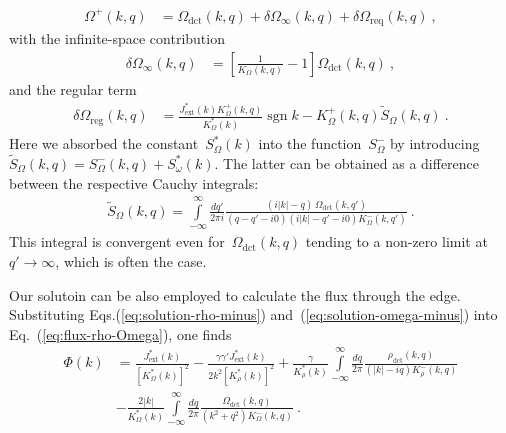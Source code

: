 \documentclass[preprint,aps,eqsecnum, prb]{revtex4-1}
\newcommand{\fplus}[1]{{#1}^{+}}
\newcommand{\fminus}[1]{{#1}^{-}}
\newcommand{\sgn}{\mathop{\mathrm{sgn}}\nolimits}
\newcommand{\dct}[1]{{#1}_\mathrm{dct}}
\begin{document}
\begin{align}
  \label{eq:solution-omega-plus}
  \fplus{\Omega}(k, q) &= \dct{\Omega}(k, q)
                           + \delta\Omega_{\infty}(k, q)
                           + \delta\Omega_\mathrm{req}(k, q)\ ,
\end{align}
with the infinite-space contribution
\begin{align}
  \delta\Omega_\mathrm{\infty}(k, q) &=
        \left[\frac{1}{K_\Omega(k, q)} - 1 \right] \dct{\Omega}(k, q)\ ,
\end{align}
and the regular term
\begin{align}
  \delta\Omega_\mathrm{reg}(k, q) &=
  \frac{J_\mathrm{ext}^\ast(k) \fplus{K}_\Omega(k, q)}{K_\Omega^\ast(k)}
                                    \sgn{k}
  - \fplus{K}_\Omega(k, q) {\tilde S}_\Omega(k, q)
  \ .
\end{align}
Here we absorbed the constant~$S_\Omega^\ast(k)$
into the function~$\fminus{S}_\Omega$ by introducing
${\tilde S}_\Omega(k, q) = \fminus{S}_\Omega(k, q) + S_\omega^\ast(k)$.
The latter can be obtained as a difference between  the
respective Cauchy integrals:
\begin{align}
  \label{eq:solution-psi}
  {\tilde{S}}_\Omega(k, q) = \int\limits_{-\infty}^{\infty}
  \frac{dq'}{2\pi i} \frac{(i|k| - q) \,
  \dct{\Omega}(k, q')}{(q - q' - i0)(i|k| - q' - i0) \fminus{K}_\Omega(k, q')}
  \ .
\end{align}
This integral is convergent even for~$\dct{\Omega}(k, q)$
tending to a non-zero limit at~$q'\to \infty$, which is often the case.

Our solutoin
can be also  employed to calculate the flux through the edge. Substituting
Eqs.(\ref{eq:solution-rho-minus}) and~(\ref{eq:solution-omega-minus})
into Eq.~(\ref{eq:flux-rho-Omega}),
one finds
\begin{align}
  \label{eq:phi-general}
  \Phi(k) &= \frac{J_\mathrm{ext}^\ast(k)}{\left[K_\Omega^\ast(k)\right]^2}
  - \frac{\gamma \gamma' J_\mathrm{ext}^\ast(k)}{2k^2 \left[K_\rho^\ast(k)\right]^2}
  + \frac{\gamma}{K_\rho^\ast(k)} \int\limits_{-\infty}^{\infty}
    \frac{dq}{2\pi}
  \frac{\dct{\rho}(k, q)}{(|k| - i q) \fminus{K}_\rho(k, q)}
  \nonumber
  \\
   &- \frac{2|k|}{K_\Omega^\ast(k)} \int\limits_{-\infty}^{\infty}
     \frac{dq}{2\pi}
     \frac{\dct{\Omega}(k, q)}{(k^2 + q^2)\fminus{K}_\Omega(k, q)}
    \ .
\end{align}
\end{document}
